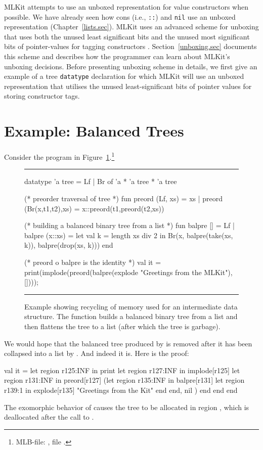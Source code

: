 \documentclass[12pt]{book}
\begin{document}
MLKit attempts to use an unboxed representation for value constructors when
possible. We have already seen how cons (i.e., \lstinline{::}) and
\lstinline{nil} use an unboxed representation (Chapter~\ref{lists.sec}). MLKit
uses an advanced scheme for
%
%
%
unboxing that uses both the unused least significant bits and the unused most
significant bits of pointer-values for tagging constructors
\cite{10.1145/3674628}. Section~\ref{unboxing.sec} documents this scheme and
describes how the programmer can learn about MLKit's unboxing decisions. Before
presenting unboxing scheme in details, we first give an example of a tree
\lstinline{datatype} declaration for which MLKit will use an unboxed
representation that utilises the unused least-significant bits of pointer values
for storing constructor tags.

\section{Example: Balanced Trees}
Consider the program in Figure~\ref{balpre.fig}.\footnote{MLB-file:
  , file .}
\begin{figure}
\hrule
\medskip
\begin{smlcode}
  datatype 'a tree = Lf | Br of 'a * 'a tree * 'a tree

  (* preorder traversal of tree *)
  fun preord (Lf, xs) = xs
    | preord (Br(x,t1,t2),xs) =
        x::preord(t1,preord(t2,xs))

  (* building a balanced binary tree from a list *)
  fun balpre [] = Lf
    | balpre (x::xs) =
       let val k = length xs div 2
       in Br(x, balpre(take(xs, k)),
                balpre(drop(xs, k)))
       end

  (* preord o balpre is the identity *)
  val it = print(implode(preord(balpre(explode
      "Greetings from the MLKit\n"),[])));
\end{smlcode}
\caption{Example showing recycling of memory used for an intermediate data
  structure. The function  builds a balanced binary tree from a list
  and  then flattens the tree to a list (after which the tree is
  garbage).}
\medskip \hrule
\label{balpre.fig}
\end{figure}
We would hope that the balanced tree produced by  is
removed after it has been collapsed into a list by .  And
indeed it is. Here is the proof:
\begin{smlcode}
  val it =
    let region r125:INF
    in  print
        let region r127:INF
        in  implode[r125]
            let region r131:INF
            in  preord[r127]
                (let region r135:INF
                 in  balpre[r131]
                     let region r139:1
                     in  explode[r135] "Greetings from the Kit\n"
                     end
                 end,
                 nil
                )
            end
        end
    end
\end{smlcode}
The exomorphic behavior of  causes the tree to be allocated in region
, which is deallocated after the call to .
\end{document}
